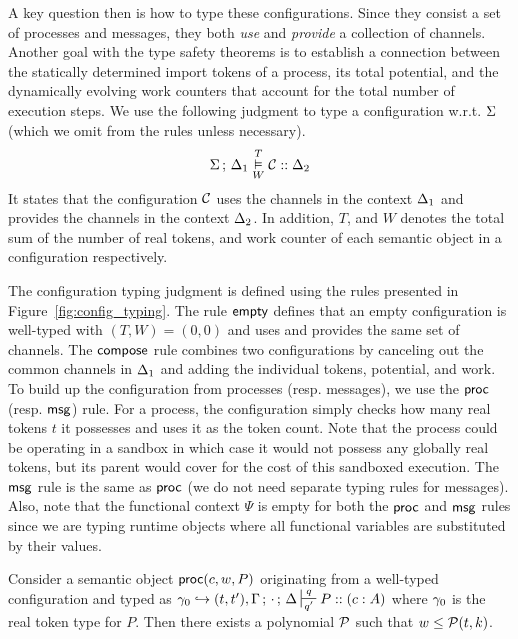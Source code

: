A key question then is how to type these configurations.
Since they consist a set of processes and messages, they
both \emph{use} and \emph{provide} a collection of channels.
Another goal with the type safety theorems is to establish a connection
between the statically determined import tokens of a process,
its total potential, and the dynamically evolving work counters
that account for the total number of execution steps.
We use the following judgment to type a configuration w.r.t. $\Sigma$
(which we omit from the rules unless necessary).
\vspace{-0.2em}
\[
\Sigma \, ; \, \Delta_1 \overset{T}{\underset{W}{\vDash}} \mathcal{C} :: \Delta_2
\]
\vspace{-0.2em}
It states that the configuration $\mathcal{C}$
uses the channels in the context $\Delta_1$ and provides the channels in
the context $\Delta_2$.
In addition, $T$, and $W$ denotes the total sum of the number of real tokens,
and work counter of each semantic object in a configuration respectively.


The configuration typing judgment is defined using
the rules presented in Figure~\ref{fig:config_typing}.
%
The rule $\mathsf{empty}$ defines that an empty configuration
is well-typed with $(T, W) = (0, 0)$ and uses and
provides the same set of channels.
The $\mathsf{compose}$ rule combines two configurations by canceling out
the common channels in $\Delta_1$ and adding the individual tokens, potential, and work.
To build up the configuration from processes (resp. messages), we use the $\mathsf{proc}$ (resp. $\mathsf{msg}$) rule.
For a process, the configuration simply checks how many real tokens $t$ it possesses and
uses it as the token count.
Note that the process could be operating in a sandbox in which case it would not possess
any globally real tokens, but its parent would cover for the cost of this sandboxed execution.
The $\mathsf{msg}$ rule is the same as $\mathsf{proc}$ (we do not need separate typing rules for messages).
Also, note that the functional context $\Psi$ is empty for both the $\mathsf{proc}$ and $\mathsf{msg}$
rules since we are typing runtime objects where all functional variables are substituted
by their values.

\begin{lemma}\label{lem:local_ppt}
  Consider a semantic object $\mathsf{proc}(c, w, P)$ originating from a well-typed configuration and
  typed as $\K_0 \hookrightarrow (t, t'), \Tokens \semi \cdot \semi \D \entailpot{q}{q'} P :: (c : A)$
  where $\gamma_0$ is the real token type for $P$.
  Then there exists a polynomial $\mathcal{P}$ such that $w \leq \mathcal{P}(t, k)$.
\end{lemma}

